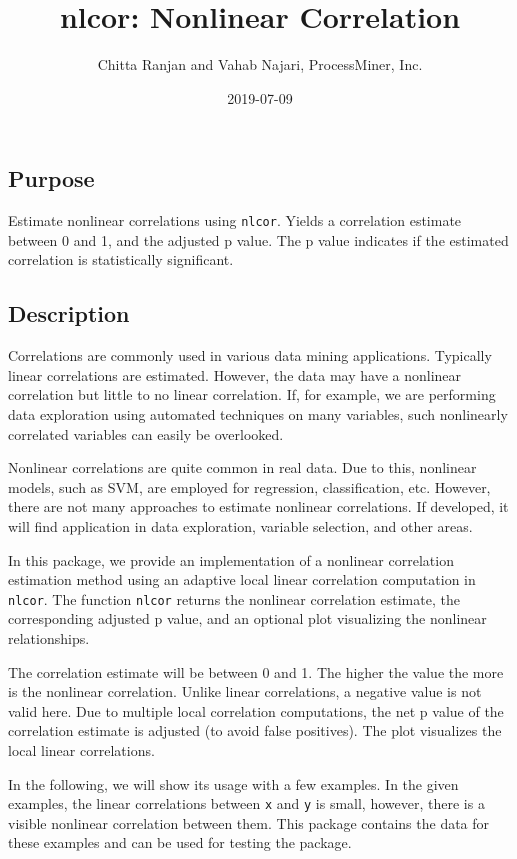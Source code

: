 \documentclass[]{article}
\title{nlcor: Nonlinear Correlation}
\author{Chitta Ranjan and Vahab Najari, ProcessMiner, Inc.}
\date{2019-07-09}
\begin{document}
\maketitle

\hypertarget{purpose}{%
\subsection{Purpose}\label{purpose}}

Estimate nonlinear correlations using \texttt{nlcor}. Yields a
correlation estimate between 0 and 1, and the adjusted p value. The p
value indicates if the estimated correlation is statistically
significant.

\hypertarget{description}{%
\subsection{Description}\label{description}}

Correlations are commonly used in various data mining applications.
Typically linear correlations are estimated. However, the data may have
a nonlinear correlation but little to no linear correlation. If, for
example, we are performing data exploration using automated techniques
on many variables, such nonlinearly correlated variables can easily be
overlooked.

Nonlinear correlations are quite common in real data. Due to this,
nonlinear models, such as SVM, are employed for regression,
classification, etc. However, there are not many approaches to estimate
nonlinear correlations. If developed, it will find application in data
exploration, variable selection, and other areas.

In this package, we provide an implementation of a nonlinear correlation
estimation method using an adaptive local linear correlation computation
in \texttt{nlcor}. The function \texttt{nlcor} returns the nonlinear
correlation estimate, the corresponding adjusted p value, and an
optional plot visualizing the nonlinear relationships.

The correlation estimate will be between 0 and 1. The higher the value
the more is the nonlinear correlation. Unlike linear correlations, a
negative value is not valid here. Due to multiple local correlation
computations, the net p value of the correlation estimate is adjusted
(to avoid false positives). The plot visualizes the local linear
correlations.

In the following, we will show its usage with a few examples. In the
given examples, the linear correlations between \texttt{x} and
\texttt{y} is small, however, there is a visible nonlinear correlation
between them. This package contains the data for these examples and can
be used for testing the package.
\end{document}
